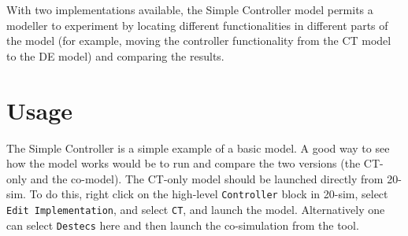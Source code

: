 With two implementations available, the Simple Controller model
permits a modeller to experiment by locating different functionalities
in different parts of the model (for example, moving the controller
functionality from the CT model to the DE model) and comparing the
results. 

\section{Usage} 
The Simple Controller is a simple
example of a basic model. A good way to see how the model works
would be to run and compare the two versions (the CT-only and
the co-model). The CT-only model should be launched directly
from 20-sim. To do this, right click on the high-level \texttt{Controller} block in
20-sim, select \texttt{Edit Implementation}, and select
\texttt{CT}, and launch the model. 
Alternatively one can select \texttt{Destecs} here and
then launch the co-simulation from the \DESTECS tool.
